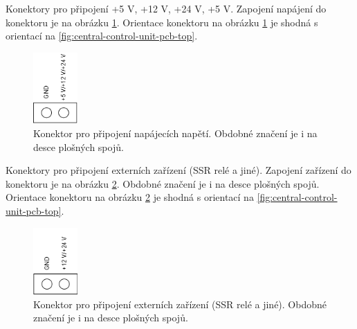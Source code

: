 \newpage
\begin{Czech}
\end{Czech}

\begin{Czech}
Konektory pro připojení +5 V, +12 V, +24 V, +5 V. Zapojení napájení do konektoru je na obrázku \ref{fig:central-control-unit-terminal-blocks-power-supply}. Orientace konektoru na obrázku \ref{fig:central-control-unit-terminal-blocks-power-supply} je shodná s orientací na \ref{fig:central-control-unit-pcb-top}.
\end{Czech}

\begin{Czech}
\begin{figure}[H]
    \centering
    \includegraphics[width=0.15\textwidth]{pictures/all/hardware/central-control-unit-terminal-blocks-power-supply.png}
    \caption{Konektor pro připojení napájecích napětí.  Obdobné značení je i na desce plošných spojů.}
    \label{fig:central-control-unit-terminal-blocks-power-supply}
\end{figure}
\end{Czech}

\begin{Czech}
\end{Czech}

\begin{Czech}
Konektory pro připojení externích zařízení (SSR relé a jiné).  Zapojení zařízení do konektoru je na obrázku \ref{fig:central-control-unit-terminal-block-relays}. Obdobné značení je i na desce plošných spojů. Orientace konektoru na obrázku \ref{fig:central-control-unit-terminal-block-relays} je shodná s orientací na \ref{fig:central-control-unit-pcb-top}.
\end{Czech}

\begin{Czech}
\begin{figure}[H]
    \centering
    \includegraphics[width=0.15\textwidth]{pictures/all/hardware/central-control-unit-terminal-block-relays.png}
    \caption{Konektor pro připojení externích zařízení (SSR relé a jiné). Obdobné značení je i na desce plošných spojů.}
    \label{fig:central-control-unit-terminal-block-relays}
\end{figure}
\end{Czech}

